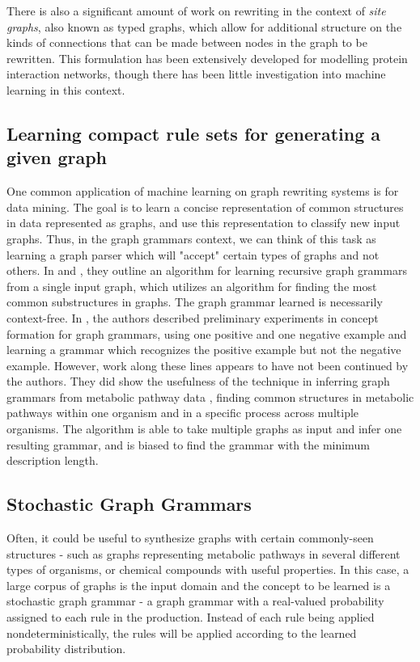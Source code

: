 \documentclass[]{article}
\begin{document}
There is also a significant amount of work on rewriting in the context of
\emph{site graphs}, also known as typed graphs, which allow for additional
structure on the kinds of connections that can be made between nodes in the
graph to be rewritten. This formulation has been extensively developed for
modelling protein interaction networks, though there has been little
investigation into machine learning in this context.

\subsection{Learning compact rule sets for generating a given graph}

One common application of machine learning on graph rewriting systems is for
data mining. The goal is to learn a concise representation of common structures
in data represented as graphs, and use this representation to classify new input
graphs. Thus, in the graph grammars context, we can think of this task as
learning a graph parser which will "accept" certain types of graphs and not
others. In \cite{jonyer2002concept} and \cite{jonyer2004mdl}, they outline an
algorithm for learning recursive graph grammars from a single input graph, which
utilizes an algorithm for finding the most common substructures in graphs. The
graph grammar learned is necessarily context-free. In \cite{jonyer2004mdl}, the
authors described preliminary experiments in concept formation for graph
grammars, using one positive and one negative example and learning a grammar
which recognizes the positive example but not the negative example. However,
work along these lines appears to have not been continued by the authors. They
did show the usefulness of the technique in inferring graph grammars from
metabolic pathway data \cite{kukluk2007learning}, finding common structures
in metabolic pathways within one organism and in a specific process across
multiple organisms. The algorithm is able to take multiple graphs as input and
infer one resulting grammar, and is biased to find the grammar with the minimum
description length.

\subsection{Stochastic Graph Grammars}

Often, it could be useful to synthesize graphs with certain commonly-seen
structures - such as graphs representing metabolic pathways in several different
types of organisms, or chemical compounds with useful properties. In this case,
a large corpus of graphs is the input domain and the concept to be learned is a
stochastic graph grammar - a graph grammar with a real-valued probability
assigned to each rule in the production. Instead of each rule being applied
nondeterministically, the rules will be applied according to the learned
probability distribution.
\end{document}
